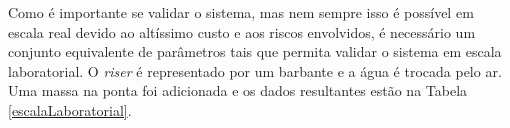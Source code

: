 Como é importante se validar o sistema, mas nem sempre isso é possível em escala real devido ao altíssimo custo e aos riscos envolvidos, é necessário um conjunto equivalente de parâmetros tais que permita validar o sistema em escala laboratorial. O \textit{riser} é representado por um barbante e a água é trocada pelo ar. Uma massa na ponta foi adicionada e os dados resultantes estão na Tabela \ref{escalaLaboratorial}.

